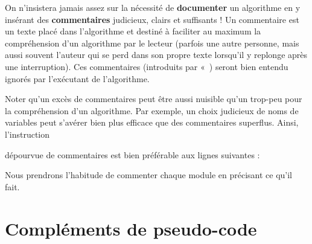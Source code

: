 		On n’insistera jamais assez sur la nécessité de \textbf{documenter} un
		algorithme en y insérant des \textbf{commentaires} judicieux, clairs et
		suffisants ! Un commentaire est un texte placé dans
		l'algorithme et destiné à faciliter au maximum la
		compréhension d’un algorithme par le lecteur (parfois une autre
		personne, mais aussi souvent l'auteur qui se perd dans
		son propre texte lorsqu'il y replonge après une
		interruption). Ces commentaires (introduits par
		«~) seront bien entendu ignorés par
		l’exécutant de l’algorithme.


		Noter qu’un excès de commentaires peut être aussi nuisible qu’un
		trop-peu pour la compréhension d’un algorithme. Par exemple, un choix
		judicieux de noms de variables peut s’avérer bien plus efficace que des
		commentaires superflus. Ainsi, l’instruction


		dépourvue de commentaires est bien préférable aux lignes suivantes :

		
		Nous prendrons l'habitude de commenter chaque module en précisant ce qu'il fait.

	\section{Compléments de pseudo-code}


